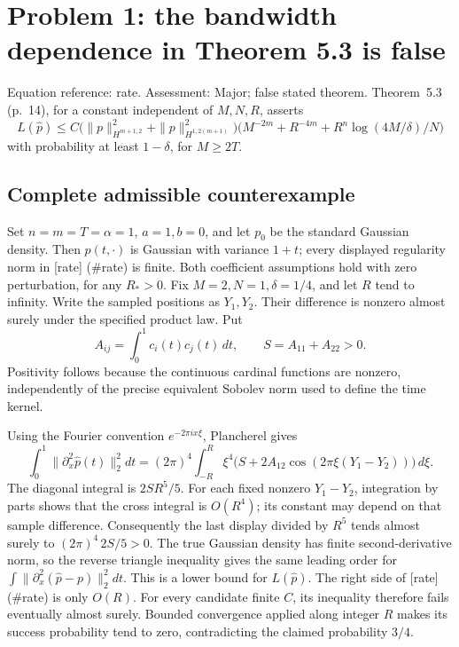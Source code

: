 \documentclass[10pt]{article}
\begin{document}
\section*{Problem 1: the bandwidth dependence in Theorem 5.3 is false}
Equation reference: rate. Assessment: Major; false stated theorem. Theorem 5.3 (p. 14), for a constant independent of \(M,N,R\), asserts \[
 L(\widehat p)\le C
 \bigl(\|p\|_{H^{m+1,2}}^2+\|p\|_{H^{1,2(m+1)}}^2\bigr)
 \bigl(M^{-2m}+R^{-4m}+R^n\log(4M/\delta)/N\bigr)\] with probability at least \(1-\delta\), for \(M\ge2T\).\par
\subsection*{Complete admissible counterexample}
Set \(n=m=T=\alpha=1\), \(a=1,b=0\), and let \(p_0\) be the standard Gaussian density. Then \(p(t,\cdot)\) is Gaussian with variance \(1+t\); every displayed regularity norm in [rate] (\#rate) is finite. Both coefficient assumptions hold with zero perturbation, for any \(R_*>0\). Fix \(M=2,N=1,\delta=1/4\), and let \(R\) tend to infinity. Write the sampled positions as \(Y_1,Y_2\). Their difference is nonzero almost surely under the specified product law. Put \[A_{ij}=\int_0^1c_i(t)c_j(t)\,dt,\qquad S=A_{11}+A_{22}>0 .\] Positivity follows because the continuous cardinal functions are nonzero, independently of the precise equivalent Sobolev norm used to define the time kernel.\par
Using the Fourier convention \(e^{-2\pi i x\xi}\), Plancherel gives \[\int_0^1\|\partial_x^2\widehat p(t)\|_2^2dt
 =(2\pi)^4\int_{-R}^R\xi^4
       \bigl(S+2A_{12}\cos(2\pi\xi(Y_1-Y_2))\bigr)\,d\xi .\] The diagonal integral is \(2SR^5/5\). For each fixed nonzero \(Y_1-Y_2\), integration by parts shows that the cross integral is \(O(R^4)\); its constant may depend on that sample difference. Consequently the last display divided by \(R^5\) tends almost surely to \((2\pi)^4\,2S/5>0\). The true Gaussian density has finite second-derivative norm, so the reverse triangle inequality gives the same leading order for \(\int\|\partial_x^2(\widehat p-p)\|_2^2dt\). This is a lower bound for \(L(\widehat p)\). The right side of [rate] (\#rate) is only \(O(R)\). For every candidate finite \(C\), its inequality therefore fails eventually almost surely. Bounded convergence applied along integer \(R\) makes its success probability tend to zero, contradicting the claimed probability \(3/4\).\par
\end{document}
